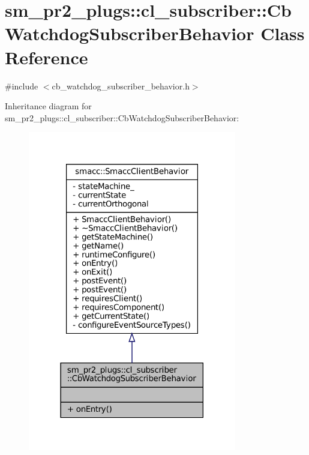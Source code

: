 \hypertarget{classsm__pr2__plugs_1_1cl__subscriber_1_1CbWatchdogSubscriberBehavior}{}\section{sm\+\_\+pr2\+\_\+plugs\+:\+:cl\+\_\+subscriber\+:\+:Cb\+Watchdog\+Subscriber\+Behavior Class Reference}
\label{classsm__pr2__plugs_1_1cl__subscriber_1_1CbWatchdogSubscriberBehavior}


{\ttfamily \#include $<$cb\+\_\+watchdog\+\_\+subscriber\+\_\+behavior.\+h$>$}



Inheritance diagram for sm\+\_\+pr2\+\_\+plugs\+:\+:cl\+\_\+subscriber\+:\+:Cb\+Watchdog\+Subscriber\+Behavior\+:
\nopagebreak
\begin{figure}[H]
\begin{center}
\leavevmode
\includegraphics[width=258pt]{classsm__pr2__plugs_1_1cl__subscriber_1_1CbWatchdogSubscriberBehavior__inherit__graph}
\end{center}
\end{figure}


